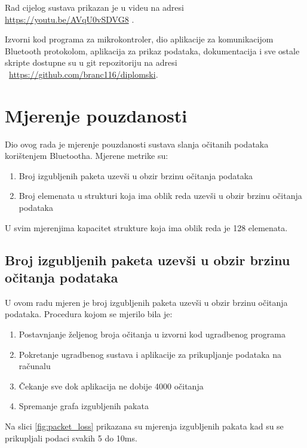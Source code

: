 \documentclass[times, utf8, diplomski]{diplomski}
\begin{document}
Rad cijelog sustava prikazan je u videu na adresi \url{https://youtu.be/AVqU0vSDVG8} \cite{videodemo}.

Izvorni kod programa za mikrokontroler, dio aplikacije za komunikacijom Bluetooth protokolom, aplikacija za prikaz podataka, dokumentacija i sve ostale skripte dostupne su u git repozitoriju na adresi \ \url{https://github.com/branc116/diplomski}.

\newpage
\chapter{Mjerenje pouzdanosti}
Dio ovog rada je mjerenje pouzdanosti sustava slanja očitanih podataka korištenjem Bluetootha. Mjerene metrike su:
\begin{enumerate}
  \item Broj izgubljenih paketa uzevši u obzir brzinu očitanja podataka
  \item Broj elemenata u strukturi koja ima oblik reda uzevši u obzir brzinu očitanja podataka
\end{enumerate}
U svim mjerenjima kapacitet strukture koja ima oblik reda je 128 elemenata.

\section{Broj izgubljenih paketa uzevši u obzir brzinu očitanja podataka}
U ovom radu mjeren je broj izgubljenih paketa uzevši u obzir brzinu očitanja podataka. Procedura kojom se mjerilo bila je:
\begin{enumerate}
  \item Postavnjanje željenog broja očitanja u izvorni kod ugradbenog programa
  \item Pokretanje ugradbenog sustava i aplikacije za prikupljanje podataka na računalu
  \item Čekanje sve dok aplikacija ne dobije 4000 očitanja
  \item Spremanje grafa izgubljenih pakata
\end{enumerate}

Na slici \ref{fig:packet_loss} prikazana su mjerenja izgubljenih pakata kad su se prikupljali podaci svakih 5 do 10ms.
\end{document}
